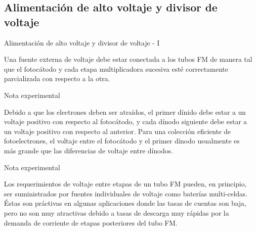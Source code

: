 \documentclass[a4paper,10pt]{beamer}
\begin{document}
\subsection{Alimentación de alto voltaje y divisor de voltaje}
\begin{frame}{Alimentación de alto voltaje y divisor de voltaje - I}
  
 \begin{justify} 
 Una fuente externa de voltaje debe estar conectada a los tubos FM de manera tal que 
 el fotocátodo y cada etapa multiplicadora sucesiva esté correctamente parcializada 
 con respecto a la otra.
 
 \begin{exampleblock}{Nota experimental}
 \begin{justify}
  Debido a que los electrones deben ser atraídos, el primer dínido debe estar a 
  un voltaje positivo con respecto al fotocátodo, y cada dínodo siguiente debe estar 
  a un voltaje positivo con respecto al anterior. Para una colección eficiente de 
  fotoelectrones, el voltaje entre el fotocátodo y el primer dínodo usualmente 
  es más grande que las diferencias de voltaje entre dínodos.
  \end{justify}
 \end{exampleblock}
 
\begin{exampleblock}{Nota experimental}
 \begin{justify}
  Los requerimientos de voltaje entre etapas de un tubo FM pueden, en principio, 
  ser suministrados por fuentes individuales de voltaje como baterías multi-celdas.
  Éstas son práctivas en algunas aplicaciones donde las tasas de cuentas son baja, pero 
  no son muy atractivas debido a tasas de descarga muy rápidas por la demanda 
  de corriente de etapas posteriores del tubo FM.
  \end{justify}
 \end{exampleblock}
 
 \end{justify}
\end{frame}
\end{document}
